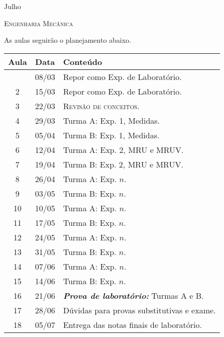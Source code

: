 %
\begin{marginfigure}
    \centering
    Julho\\
\end{marginfigure}
\vspace{1cm}
\begin{center}
\Large\textsc{Engenharia Mecânica}
\end{center}

As aulas seguirão o planejamento abaixo.
\begin{center}
\begin{longtable}{ccp{70mm}}
\toprule
Aula & Data & Conteúdo \\
\midrule
\endhead
\bottomrule
\endfoot
 1 & 08/03 & Repor como Exp. de Laboratório. \\
 2 & 15/03 & Repor como Exp. de Laboratório. \\
 3 & 22/03 & \textsc{Revisão de conceitos.} \\
 4 & 29/03 & Turma A: Exp. 1, Medidas. \\ 
 5 & 05/04 & Turma B: Exp. 1, Medidas. \\
 6 & 12/04 & Turma A: Exp. 2, MRU e MRUV. \\
 7 & 19/04 & Turma B: Exp. 2, MRU e MRUV. \\
 8 & 26/04 & Turma A: Exp. $n$. \\
 9 & 03/05 & Turma B: Exp. $n$. \\
10 & 10/05 & Turma A: Exp. $n$. \\
11 & 17/05 & Turma B: Exp. $n$. \\
12 & 24/05 & Turma A: Exp. $n$. \\
13 & 31/05 & Turma B: Exp. $n$. \\
14 & 07/06 & Turma A: Exp. $n$. \\
15 & 14/06 & Turma B: Exp. $n$. \\
16 & 21/06 & \textbf{\textit{Prova de laboratório:}} Turmas A e B. \\
17 & 28/06 & Dúvidas para provas substitutivas e exame. \\
18 & 05/07 & Entrega das notas finais de laboratório. \\
\end{longtable}
\end{center}

\cleardoublepage
